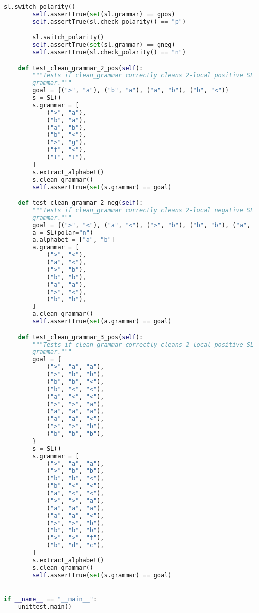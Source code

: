 \begin{lstlisting}[language=Python]
        sl.switch_polarity()
        self.assertTrue(set(sl.grammar) == gpos)
        self.assertTrue(sl.check_polarity() == "p")

        sl.switch_polarity()
        self.assertTrue(set(sl.grammar) == gneg)
        self.assertTrue(sl.check_polarity() == "n")

    def test_clean_grammar_2_pos(self):
        """Tests if clean_grammar correctly cleans 2-local positive SL
        grammar."""
        goal = {(">", "a"), ("b", "a"), ("a", "b"), ("b", "<")}
        s = SL()
        s.grammar = [
            (">", "a"),
            ("b", "a"),
            ("a", "b"),
            ("b", "<"),
            (">", "g"),
            ("f", "<"),
            ("t", "t"),
        ]
        s.extract_alphabet()
        s.clean_grammar()
        self.assertTrue(set(s.grammar) == goal)

    def test_clean_grammar_2_neg(self):
        """Tests if clean_grammar correctly cleans 2-local negative SL
        grammar."""
        goal = {(">", "<"), ("a", "<"), (">", "b"), ("b", "b"), ("a", "a")}
        a = SL(polar="n")
        a.alphabet = ["a", "b"]
        a.grammar = [
            (">", "<"),
            ("a", "<"),
            (">", "b"),
            ("b", "b"),
            ("a", "a"),
            (">", "<"),
            ("b", "b"),
        ]
        a.clean_grammar()
        self.assertTrue(set(a.grammar) == goal)

    def test_clean_grammar_3_pos(self):
        """Tests if clean_grammar correctly cleans 2-local positive SL
        grammar."""
        goal = {
            (">", "a", "a"),
            (">", "b", "b"),
            ("b", "b", "<"),
            ("b", "<", "<"),
            ("a", "<", "<"),
            (">", ">", "a"),
            ("a", "a", "a"),
            ("a", "a", "<"),
            (">", ">", "b"),
            ("b", "b", "b"),
        }
        s = SL()
        s.grammar = [
            (">", "a", "a"),
            (">", "b", "b"),
            ("b", "b", "<"),
            ("b", "<", "<"),
            ("a", "<", "<"),
            (">", ">", "a"),
            ("a", "a", "a"),
            ("a", "a", "<"),
            (">", ">", "b"),
            ("b", "b", "b"),
            (">", ">", "f"),
            ("b", "d", "c"),
        ]
        s.extract_alphabet()
        s.clean_grammar()
        self.assertTrue(set(s.grammar) == goal)


if __name__ == "__main__":
    unittest.main()

\end{lstlisting}

